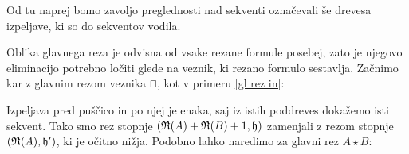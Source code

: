 Od tu naprej bomo zavoljo preglednosti nad sekventi označevali še drevesa izpeljave, ki so do sekventov vodila.

Oblika glavnega reza je odvisna od vsake rezane formule posebej, zato je njegovo eliminacijo potrebno ločiti glede na veznik, ki rezano formulo sestavlja. Začnimo kar z glavnim rezom veznika $\sqcap$, kot v primeru \ref{gl rez in}:
\begin{prooftree}


\end{prooftree}
\dol
\begin{prooftree}
\end{prooftree}
Izpeljava pred puščico in po njej je enaka, saj iz istih poddreves dokažemo isti sekvent. Tako smo rez stopnje $(\R(A) + \R(B) + 1,\h)$ zamenjali z rezom stopnje $(\R(A),\h')$, ki je očitno nižja. Podobno lahko naredimo za glavni rez $A \star B$:
\begin{prooftree}


\end{prooftree}
\dol
\begin{prooftree}

\end{prooftree}
